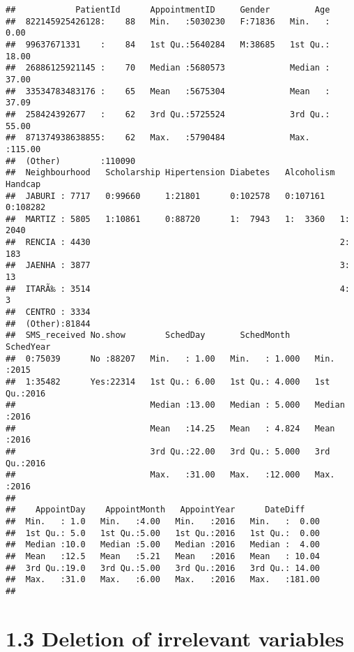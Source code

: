 \documentclass[]{article}
\begin{document}
\begin{verbatim}
##            PatientId      AppointmentID     Gender         Age        
##  822145925426128:    88   Min.   :5030230   F:71836   Min.   :  0.00  
##  99637671331    :    84   1st Qu.:5640284   M:38685   1st Qu.: 18.00  
##  26886125921145 :    70   Median :5680573             Median : 37.00  
##  33534783483176 :    65   Mean   :5675304             Mean   : 37.09  
##  258424392677   :    62   3rd Qu.:5725524             3rd Qu.: 55.00  
##  871374938638855:    62   Max.   :5790484             Max.   :115.00  
##  (Other)        :110090                                               
##  Neighbourhood   Scholarship Hipertension Diabetes   Alcoholism Handcap   
##  JABURI : 7717   0:99660     1:21801      0:102578   0:107161   0:108282  
##  MARTIZ : 5805   1:10861     0:88720      1:  7943   1:  3360   1:  2040  
##  RENCIA : 4430                                                  2:   183  
##  JAENHA : 3877                                                  3:    13  
##  ITARÃ‰ : 3514                                                  4:     3  
##  CENTRO : 3334                                                            
##  (Other):81844                                                            
##  SMS_received No.show        SchedDay       SchedMonth       SchedYear   
##  0:75039      No :88207   Min.   : 1.00   Min.   : 1.000   Min.   :2015  
##  1:35482      Yes:22314   1st Qu.: 6.00   1st Qu.: 4.000   1st Qu.:2016  
##                           Median :13.00   Median : 5.000   Median :2016  
##                           Mean   :14.25   Mean   : 4.824   Mean   :2016  
##                           3rd Qu.:22.00   3rd Qu.: 5.000   3rd Qu.:2016  
##                           Max.   :31.00   Max.   :12.000   Max.   :2016  
##                                                                          
##    AppointDay    AppointMonth   AppointYear      DateDiff     
##  Min.   : 1.0   Min.   :4.00   Min.   :2016   Min.   :  0.00  
##  1st Qu.: 5.0   1st Qu.:5.00   1st Qu.:2016   1st Qu.:  0.00  
##  Median :10.0   Median :5.00   Median :2016   Median :  4.00  
##  Mean   :12.5   Mean   :5.21   Mean   :2016   Mean   : 10.04  
##  3rd Qu.:19.0   3rd Qu.:5.00   3rd Qu.:2016   3rd Qu.: 14.00  
##  Max.   :31.0   Max.   :6.00   Max.   :2016   Max.   :181.00  
## 
\end{verbatim}

\section{1.3 Deletion of irrelevant
variables}\label{deletion-of-irrelevant-variables}
\end{document}
